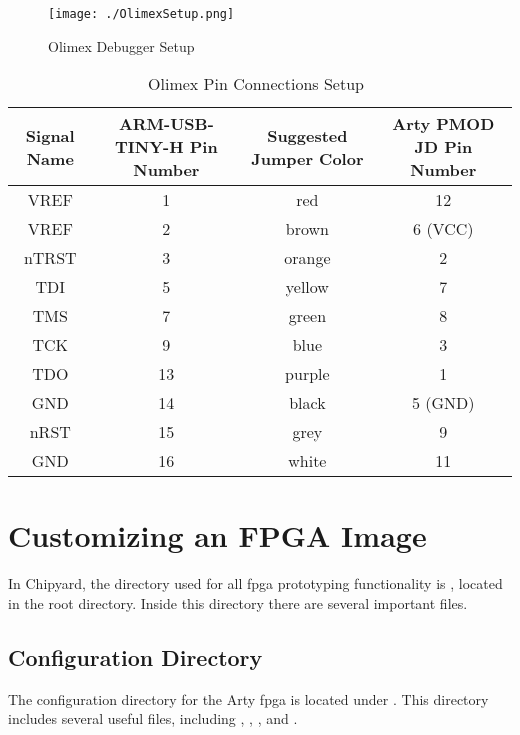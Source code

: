 \begin{figure}[h!tbp]
  \centering
  \texttt{[image: ./OlimexSetup.png]}
  \caption{Olimex Debugger Setup~\cite[p.~5]{FreedomDevGuide}}
  \label{fig:olimexsetup}
\end{figure}

\begin{table}[h!tbp]
	\centering
	\begin{tabular}{ | c | c | c | c |}
      \hline
      Signal Name & ARM-USB-TINY-H Pin Number & Suggested Jumper Color & Arty PMOD JD Pin Number \\ \hline
		VREF & 1 & red & 12 \\ \hline
		VREF & 2 & brown & 6 (VCC) \\ \hline
		nTRST & 3 & orange & 2 \\ \hline
		TDI & 5 & yellow & 7 \\ \hline
		TMS & 7 & green & 8 \\ \hline
		TCK & 9 & blue & 3 \\ \hline
		TDO & 13 & purple & 1 \\ \hline
		GND & 14 & black & 5 (GND) \\ \hline
		nRST & 15 & grey & 9 \\ \hline
		GND & 16 & white & 11 \\ \hline
	\end{tabular}
	\caption{Olimex Pin Connections Setup~\cite[p.~4]{FreedomDevGuide}}
	\label{table:Olimex_Pin_Setup}
\end{table}


\section{Customizing an FPGA Image}\label{sec:Customizing}
In Chipyard, the directory used for all \Gls{fpga} prototyping functionality is , located in the root directory.
Inside this directory there are several important files.


\subsection{Configuration Directory}\label{sec:Customizing_FPGA-Config_Directory}
The configuration directory for the Arty \Gls{fpga} is located under .
This directory includes several useful files, including , , , and .

